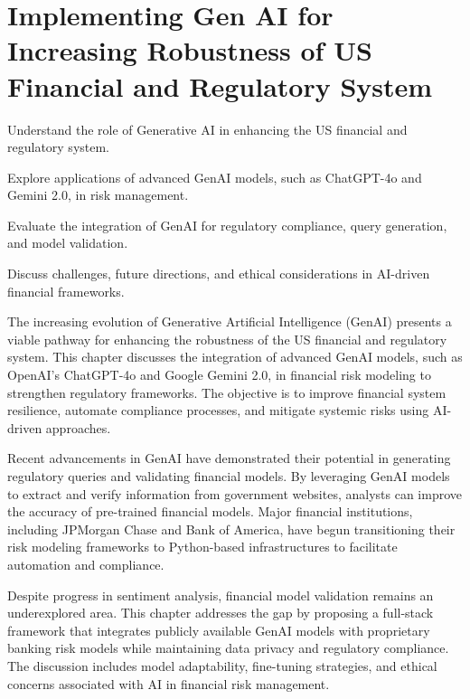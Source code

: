 \documentclass[a4paper,12pt]{scrbook}
\begin{document}
	
	\chapter{Implementing Gen AI for Increasing Robustness of US Financial and Regulatory System}
	
	\begin{arrows}
		\item Understand the role of Generative AI in enhancing the US financial and regulatory system.
		\item Explore applications of advanced GenAI models, such as ChatGPT-4o and Gemini 2.0, in risk management.
		\item Evaluate the integration of GenAI for regulatory compliance, query generation, and model validation.
		\item Discuss challenges, future directions, and ethical considerations in AI-driven financial frameworks.
	\end{arrows}
	
	The increasing evolution of Generative Artificial Intelligence (GenAI) presents a viable pathway for enhancing the robustness of the US financial and regulatory system. This chapter discusses the integration of advanced GenAI models, such as OpenAI’s ChatGPT-4o and Google Gemini 2.0, in financial risk modeling to strengthen regulatory frameworks. The objective is to improve financial system resilience, automate compliance processes, and mitigate systemic risks using AI-driven approaches.
	
	Recent advancements in GenAI have demonstrated their potential in generating regulatory queries and validating financial models. By leveraging GenAI models to extract and verify information from government websites, analysts can improve the accuracy of pre-trained financial models. Major financial institutions, including JPMorgan Chase and Bank of America, have begun transitioning their risk modeling frameworks to Python-based infrastructures to facilitate automation and compliance.
	
	Despite progress in sentiment analysis, financial model validation remains an underexplored area. This chapter addresses the gap by proposing a full-stack framework that integrates publicly available GenAI models with proprietary banking risk models while maintaining data privacy and regulatory compliance. The discussion includes model adaptability, fine-tuning strategies, and ethical concerns associated with AI in financial risk management.
	
\end{document}
